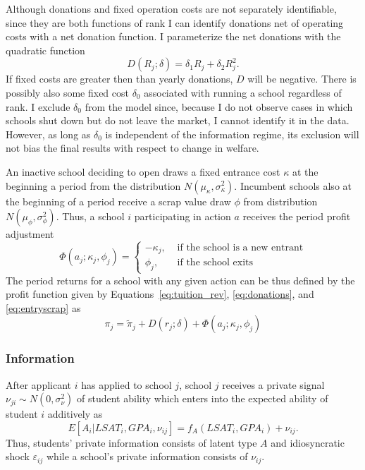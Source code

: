\documentclass[12pt]{article}
\theoremstyle{definition}
\begin{document}
Although donations and fixed operation costs are not separately identifiable, since they are both functions of rank I can identify donations net of operating costs with a net donation function. I parameterize the net donations with the quadratic function
\begin{equation}
  D(R_j; \delta) = \delta_1 R_j + \delta_2 R_j^2.
  \label{eq:donations}
\end{equation}
If fixed costs are greater then than yearly donations, $D$ will be negative. There is possibly also some fixed cost $\delta_0$ associated with running a school regardless of rank. I exclude $\delta_0$ from the model since, because I do not observe cases in which schools shut down but do not leave the market, I cannot identify it in the data. However, as long as $\delta_0$ is independent of the information regime, its exclusion will not bias the final results with respect to change in welfare.

An inactive school deciding to open draws a fixed entrance cost $\kappa$ at the beginning a period from the distribution $N(\mu_\kappa, \sigma^2_\kappa)$. Incumbent schools also at the beginning of a period receive a scrap value draw $\phi$ from distribution $N(\mu_\phi, \sigma^2_\phi)$. Thus, a school $i$ participating in action $a$ receives the period profit adjustment
\begin{equation}
  \Phi(a_j; \kappa_j, \phi_j) =
  \begin{cases}
    -\kappa_j, & \text{ if the school is a new entrant} \\
    \phi_j, & \text{ if the school exits}
  \end{cases}
  \label{eq:entryscrap}
\end{equation}
The period returns for a school with any given action can be thus defined by the profit function given by Equations~\eqref{eq:tuition_rev}, \eqref{eq:donations}, and \eqref{eq:entryscrap} as
\begin{equation}
  \pi_j = \tilde{\pi}_j + D(r_j; \delta) + \Phi(a_j; \kappa_j, \phi_j)
  \label{eq:profit}
\end{equation}

\subsubsection{Information}

After applicant $i$ has applied to school $j$, school $j$ receives a private signal $\nu_{ji}\sim N(0, \sigma_\nu^2)$ of student ability which enters into the expected ability of student $i$ additively as
\begin{equation}
  E[A_i | LSAT_i, GPA_i, \nu_{ij}] = f_A(LSAT_i, GPA_i) + \nu_{ij}.
\end{equation}
Thus, students' private information consists of latent type $A$ and idiosyncratic shock $\varepsilon_{ij}$ while a school's private information consists of $\nu_{ij}$.
\end{document}
